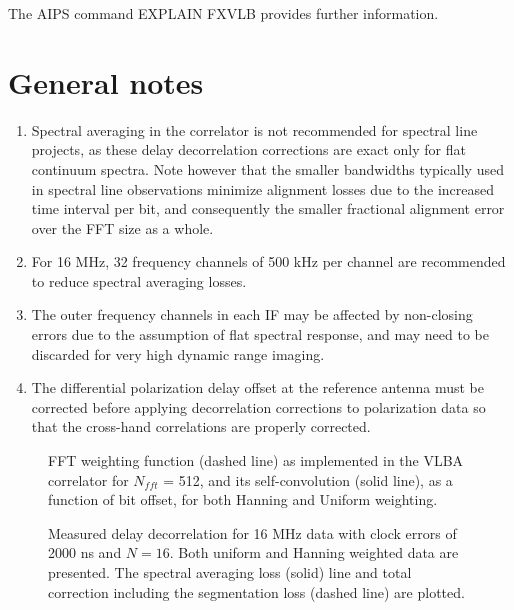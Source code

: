 The AIPS command EXPLAIN FXVLB provides further information.

\section{General notes}

\begin{itemize}
\begin{enumerate}

\item Spectral averaging in the correlator is not recommended for
spectral line projects, as these delay decorrelation corrections are
exact only for flat continuum spectra. Note however that the smaller
bandwidths typically used in spectral line observations minimize
alignment losses due to the increased time interval per bit, and
consequently the smaller fractional alignment error over the FFT size
as a whole.

\item For 16 MHz, 32 frequency channels of 500 kHz per channel
are recommended to reduce spectral averaging losses.

\item The outer frequency channels in each IF may be affected by
non-closing errors due to the assumption of flat spectral response,
and may need to be discarded for very high dynamic range imaging.

\item The differential polarization delay offset at the reference
antenna must be corrected before applying decorrelation corrections to
polarization data so that the cross-hand correlations are properly
corrected.

\end{enumerate}
\end{itemize}

\clearpage
\begin{figure}[p]
\vspace{22cm}
\caption[]{FFT weighting function (dashed line) as implemented
in the VLBA correlator for $N_{fft}$ = 512, and its self-convolution
(solid line), as a function of bit offset, for both Hanning and
Uniform weighting.}
\label{prfig1}
\end{figure}

\clearpage
\begin{figure}[p]
\vspace{22cm}
\caption[]{Measured delay decorrelation for 16 MHz data with clock
errors of 2000 ns and $N=16$. Both uniform
and Hanning weighted data are presented. The spectral averaging loss
(solid) line and total correction including the segmentation loss
(dashed line) are plotted.}
\label{prfig2}
\end{figure}


